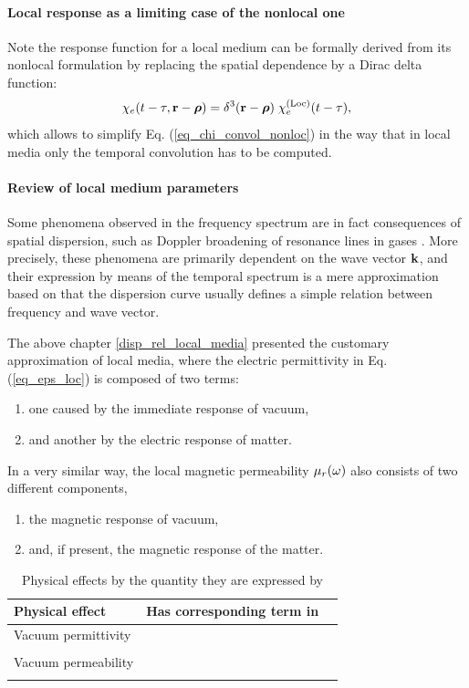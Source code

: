 \paragraph{Local response as a limiting case of the nonlocal one} %
Note the response function for a local medium can be formally derived from its nonlocal formulation by replacing the spatial dependence by a Dirac delta function: %
\begin{equation} \chi_e(t-\tau, {\mathbf{r}}-\boldsymbol{\rho}) = \delta^{3}({\mathbf{r}}-\boldsymbol{\rho}) \; \chi_e^{\rm(Loc)}(t-\tau), \label{eq_loc_chi}\end{equation}
which allows to simplify Eq. (\ref{eq_chi_convol_nonloc}) in the way that in local media only the temporal convolution has to be computed.

\paragraph{Review of local medium parameters}%
Some phenomena observed in the frequency spectrum are in fact consequences of spatial dispersion, such as Doppler broadening of resonance lines in gases \cite[p. 359]{landau1984electrodynamics}. More precisely, these phenomena are primarily dependent on the wave vector ${\mathbf{k}}$, and their expression by means of the temporal spectrum is a mere approximation based on that the dispersion curve usually defines a simple relation between  frequency and wave vector. 

The above chapter \ref{disp_rel_local_media} presented the customary approximation of local media, where the electric permittivity in Eq. (\ref{eq_eps_loc}) is composed of two terms: 
\begin{enumerate}
 \item{one caused  by the immediate response of vacuum,} 
 \item{and another by the electric response of matter.}
 \end{enumerate}
In a very similar way, the local magnetic permeability $\mu_r(\omega)$ also consists of two different components, 
\begin{enumerate}[resume]
 \item{the magnetic response of vacuum,} 
 \item{and, if present, the magnetic response of the matter.} 
\end{enumerate}
\begin{table}[ht]   \caption{Physical effects by the quantity they are expressed by}  \label{tb_nonlocaleff} \centering 
\begin{tabular}{lcr}
 \toprule
Physical effect & Has corresponding term in \\
 \hline
Vacuum permittivity &	&	\\
 &	&	\\
Vacuum permeability &	&	\\
 &	&	\\
 \bottomrule
 \end{tabular} \end{table}



